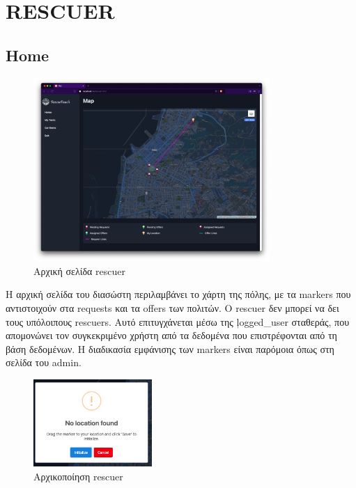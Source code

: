 \section{RESCUER}
    \subsection{Home}

        \begin{figure}[H] \noindent \centering
            \includegraphics[width=0.8\textwidth]{img/rescuer-map}
            \caption{Αρχική σελίδα rescuer}
        \end{figure}

        Η αρχική σελίδα του διασώστη περιλαμβάνει το χάρτη της πόλης, με τα markers που αντιστοιχούν στα requests και τα offers των πολιτών.
        Ο rescuer δεν μπορεί να δει τους υπόλοιπους rescuers.
        Αυτό επιτυγχάνεται μέσω της \c{logged\_user} σταθεράς, που απομονώνει τον συγκεκριμένο χρήστη από τα δεδομένα που επιστρέφονται από τη βάση δεδομένων.
        Η διαδικασία εμφάνισης των markers είναι παρόμοια όπως στη σελίδα του admin.

        \begin{figure}[H] \noindent \centering
            \includegraphics[width=0.4\textwidth]{img/rescuer-no_location}
            \caption{Αρχικοποίηση rescuer}
        \end{figure}

